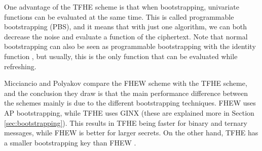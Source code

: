 One advantage of the TFHE scheme is that when bootstrapping, univariate functions can be evaluated at the same time. This is called programmable bootstrapping (PBS), and it means that with just one algorithm, we can both decrease the noise and evaluate a function of the ciphertext. Note that normal bootstrapping can also be seen as programmable bootstrapping with the identity function \cite{cite:tfhe_guide}, but usually, this is the only function that can be evaluated while refreshing.

Micciancio and Polyakov \cite{cite_fhew_vs_tfhe} compare the FHEW scheme with the TFHE scheme, and the conclusion they draw is that the main performance difference between the schemes mainly is due to the different bootstrapping techniques. FHEW uses AP bootstrapping, while TFHE uses GINX (these are explained more in Section \ref{sec:bootstrapping}). This results in TFHE being faster for binary and ternary messages, while FHEW is better for larger secrets. On the other hand, TFHE has a smaller bootstrapping key than FHEW \cite{cite:QianFHE}.